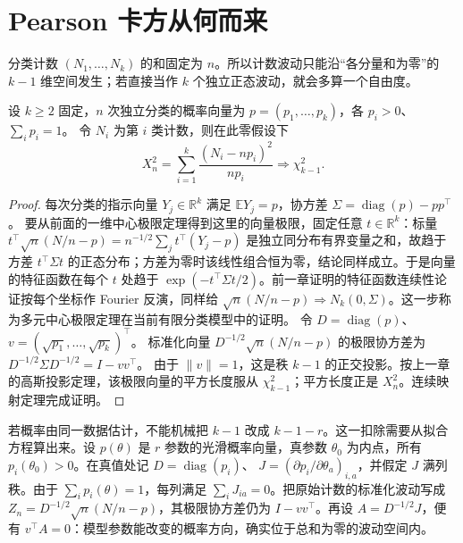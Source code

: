 \section{Pearson 卡方从何而来}

分类计数 \((N_1,\ldots,N_k)\) 的和固定为 \(n\)。所以计数波动只能沿“各分量和为零”的 \(k-1\) 维空间发生；若直接当作 \(k\) 个独立正态波动，就会多算一个自由度。

\begin{theorem}
设 \(k\ge2\) 固定，\(n\) 次独立分类的概率向量为
\(p=(p_1,\ldots,p_k)\)，各 \(p_i>0\)、\(\sum_i p_i=1\)。
令 \(N_i\) 为第 \(i\) 类计数，则在此零假设下
\[
X_n^2=\sum_{i=1}^k\frac{(N_i-np_i)^2}{np_i}
\Rightarrow\chi^2_{k-1}.
\]
\end{theorem}
\begin{proof}
每次分类的指示向量 \(Y_j\in\mathbb R^k\) 满足
\(\mathbb E Y_j=p\)，协方差
\(\Sigma=\operatorname{diag}(p)-pp^\top\)。
要从前面的一维中心极限定理得到这里的向量极限，固定任意
\(t\in\mathbb R^k\)：标量
\(t^\top\sqrt n(N/n-p)=n^{-1/2}\sum_jt^\top(Y_j-p)\)
是独立同分布有界变量之和，故趋于方差
\(t^\top\Sigma t\) 的正态分布；方差为零时该线性组合恒为零，结论同样成立。于是向量的特征函数在每个 \(t\) 处趋于
\(\exp(-t^\top\Sigma t/2)\)。前一章证明的特征函数连续性论证按每个坐标作 Fourier 反演，同样给
\(\sqrt n(N/n-p)\Rightarrow N_k(0,\Sigma)\)。这一步称为多元中心极限定理在当前有限分类模型中的证明。
令 \(D=\operatorname{diag}(p)\)、\(v=(\sqrt{p_1},\ldots,\sqrt{p_k})^\top\)。
标准化向量 \(D^{-1/2}\sqrt n(N/n-p)\) 的极限协方差为
\(D^{-1/2}\Sigma D^{-1/2}=I-vv^\top\)。
由于 \(\|v\|=1\)，这是秩 \(k-1\) 的正交投影。按上一章的高斯投影定理，该极限向量的平方长度服从 \(\chi^2_{k-1}\)；平方长度正是 \(X_n^2\)。连续映射定理完成证明。
\end{proof}

若概率由同一数据估计，不能机械把 \(k-1\) 改成 \(k-1-r\)。这一扣除需要从拟合方程算出来。设 \(p(\theta)\) 是 \(r\) 参数的光滑概率向量，真参数 \(\theta_0\) 为内点，所有 \(p_i(\theta_0)>0\)。在真值处记
\(D=\operatorname{diag}(p_i)\)、
\(J=(\partial p_i/\partial\theta_a)_{i,a}\)，并假定 \(J\) 满列秩。由于 \(\sum_i p_i(\theta)=1\)，每列满足 \(\sum_iJ_{ia}=0\)。把原始计数的标准化波动写成
\(Z_n=D^{-1/2}\sqrt n(N/n-p)\)，其极限协方差仍为
\(I-vv^\top\)。再设 \(A=D^{-1/2}J\)，便有
\(v^\top A=0\)：模型参数能改变的概率方向，确实位于总和为零的波动空间内。

